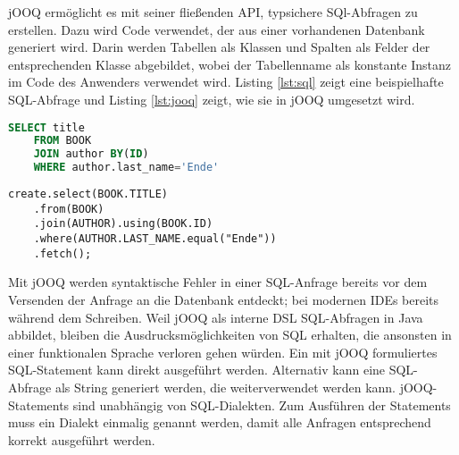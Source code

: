 jOOQ ermöglicht es mit seiner fließenden API, typsichere SQl-Abfragen zu erstellen. Dazu wird Code verwendet, der aus einer vorhandenen Datenbank generiert wird. Darin werden Tabellen als Klassen und Spalten als Felder der entsprechenden Klasse abgebildet, wobei der Tabellenname als konstante Instanz im Code des Anwenders verwendet wird.
Listing \ref{lst:sql} zeigt eine beispielhafte SQL-Abfrage und Listing \ref{lst:jooq} zeigt, wie sie in jOOQ umgesetzt wird.


\begin{lstlisting}[caption={Code einer SQL-Abfrage}, language=SQL, label=lst:sql]
	SELECT title
	FROM BOOK
	JOIN author BY(ID)
	WHERE author.last_name='Ende'
\end{lstlisting}
\pagebreak
\begin{lstlisting}[caption={Code der SQL-Abfrage implementiert mit jOOQ}, label=lst:jooq]
	create.select(BOOK.TITLE)
	.from(BOOK)
	.join(AUTHOR).using(BOOK.ID)
	.where(AUTHOR.LAST_NAME.equal("Ende"))
	.fetch();
\end{lstlisting}

Mit jOOQ werden syntaktische Fehler in einer SQL-Anfrage bereits vor dem Versenden der Anfrage an die Datenbank entdeckt; bei modernen IDEs bereits während dem Schreiben. Weil jOOQ als interne DSL SQL-Abfragen in Java abbildet, bleiben die Ausdrucksmöglichkeiten von SQL erhalten, die ansonsten in einer funktionalen Sprache verloren gehen würden. Ein mit jOOQ formuliertes SQL-Statement kann direkt ausgeführt werden. Alternativ kann eine SQL-Abfrage als String generiert werden, die weiterverwendet werden kann. jOOQ-Statements sind unabhängig von SQL-Dialekten. Zum Ausführen der Statements muss ein Dialekt einmalig genannt werden, damit alle Anfragen entsprechend korrekt ausgeführt werden.

